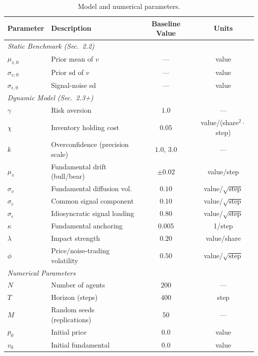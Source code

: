 
\begin{table}[t]
\centering
\scriptsize
\setlength{\tabcolsep}{3pt}
\caption{Model and numerical parameters.}
\label{tab:params}
\begin{tabular}{lp{1.8cm}cc}
\toprule
\textbf{Parameter} & \textbf{Description} & \textbf{Baseline Value} & \textbf{Units} \\
\midrule
\multicolumn{4}{l}{\textit{Static Benchmark (Sec.~2.2)}} \\
\midrule
$\mu_{v,0}$ & Prior mean of $v$ & --- & value \\
$\sigma_{v,0}$ & Prior sd of $v$ & --- & value \\
$\sigma_{\epsilon,0}$ & Signal-noise sd & --- & value \\
\midrule
\multicolumn{4}{l}{\textit{Dynamic Model (Sec.~2.3+)}} \\
\midrule
$\gamma$ & Risk aversion & $1.0$ & --- \\
$\chi$ & Inventory holding cost & $0.05$ & value/(share$^2\cdot$step) \\
$k$ & Overconfi\-dence (precision scale) & $1.0$, $3.0$ & --- \\
$\mu_v$ & Fundamental drift (bull/bear) & $\pm 0.02$ & value/step \\
$\sigma_v$ & Fundamental diffusion vol. & $0.10$ & value/$\sqrt{\text{step}}$ \\
$\sigma_c$ & Common signal component & $0.10$ & value/$\sqrt{\text{step}}$ \\
$\sigma_\epsilon$ & Idiosyncratic signal loading & $0.80$ & value/$\sqrt{\text{step}}$ \\
$\kappa$ & Fundamental anchoring & $0.005$ & 1/step \\
$\lambda$ & Impact strength & $0.20$ & value/share \\
$\phi$ & Price/noise-trading volatility & $0.50$ & value/$\sqrt{\text{step}}$ \\
\midrule
\multicolumn{4}{l}{\textit{Numerical Parameters}} \\
\midrule
$N$ & Number of agents & $200$ & --- \\
$T$ & Horizon (steps) & $400$ & step \\
$M$ & Random seeds (replications) & $50$ & --- \\
$p_0$ & Initial price & $0.0$ & value \\
$v_0$ & Initial fundamental & $0.0$ & value \\
\bottomrule
\end{tabular}
\end{table}

